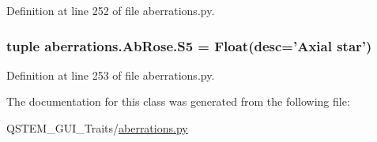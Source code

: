 Definition at line 252 of file aberrations.\-py.

\hypertarget{classaberrations_1_1_ab_rose_ae677d3a96dbbd0bffdf74551ef298f94}{
\subsubsection[{S5}]{\setlength{\rightskip}{0pt plus 5cm}tuple aberrations.\-Ab\-Rose.\-S5 = Float(desc='Axial star')\hspace{0.3cm}{\ttfamily [static]}}}\label{classaberrations_1_1_ab_rose_ae677d3a96dbbd0bffdf74551ef298f94}


Definition at line 253 of file aberrations.\-py.



The documentation for this class was generated from the following file\-:\begin{DoxyCompactItemize}
\item 
Q\-S\-T\-E\-M\-\_\-\-G\-U\-I\-\_\-\-Traits/\hyperlink{aberrations_8py}{aberrations.\-py}\end{DoxyCompactItemize}
